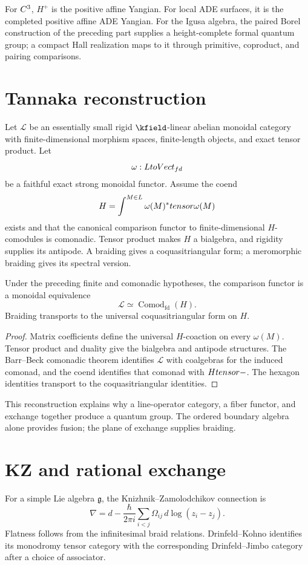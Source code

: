 For $C^3$, $H^+$ is the positive affine Yangian. For local ADE surfaces, it is the completed positive affine ADE Yangian. For the Igusa algebra, the paired Borel construction of the preceding part supplies a height-complete formal quantum group; a compact Hall realization maps to it through primitive, coproduct, and pairing comparisons.

\chapter{Tannaka reconstruction}
Let $\mathcal L$ be an essentially small rigid $\kfield$-linear abelian monoidal category with finite-dimensional morphism spaces, finite-length objects, and exact tensor product. Let
\[
 \omega:LtoVect_{fd}
\]
be a faithful exact strong monoidal functor. Assume the coend
\[
 H=\int^{M\in L}\omega(M)^*tensor\omega(M)
\]
exists and that the canonical comparison functor to finite-dimensional $H$-comodules is comonadic. Tensor product makes $H$ a bialgebra, and rigidity supplies its antipode. A braiding gives a coquasitriangular form; a meromorphic braiding gives its spectral version.

\begin{theorem}
Under the preceding finite and comonadic hypotheses, the comparison functor is a monoidal equivalence
\[
 \mathcal L\simeq\operatorname{Comod}_{\mathrm{fd}}(H).
\]
Braiding transports to the universal coquasitriangular form on $H$.
\end{theorem}
\begin{proof}
Matrix coefficients define the universal $H$-coaction on every $\omega(M)$. Tensor product and duality give the bialgebra and antipode structures. The Barr--Beck comonadic theorem identifies $\mathcal L$ with coalgebras for the induced comonad, and the coend identifies that comonad with $Htensor-$. The hexagon identities transport to the coquasitriangular identities.
\end{proof}

This reconstruction explains why a line-operator category, a fiber functor, and exchange together produce a quantum group. The ordered boundary algebra alone provides fusion; the plane of exchange supplies braiding.

\chapter{KZ and rational exchange}
For a simple Lie algebra $\mathfrak g$, the Knizhnik--Zamolodchikov connection is
\[
 \nabla=d-\frac{\hbar}{2\pi i}
 \sum_{i<j}\Omega_{ij}\,d\log(z_i-z_j).
\]
Flatness follows from the infinitesimal braid relations. Drinfeld--Kohno identifies its monodromy tensor category with the corresponding Drinfeld--Jimbo category after a choice of associator.

